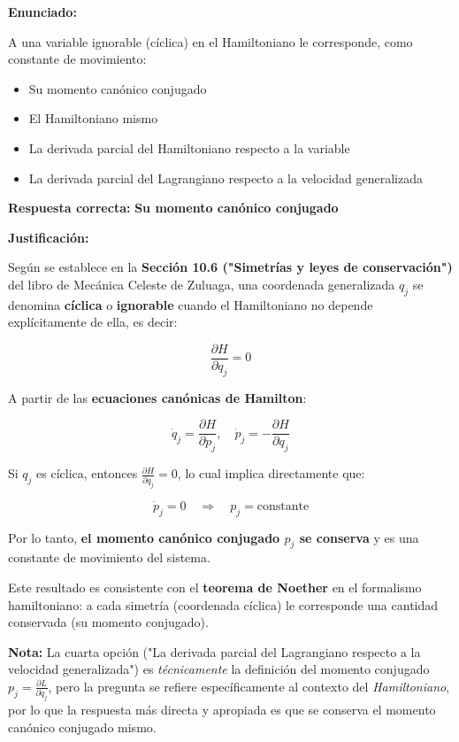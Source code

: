 \documentclass[a4paper]{article}
\begin{document}
\textbf{Enunciado:}

A una variable ignorable (cíclica) en el Hamiltoniano le corresponde, como constante de movimiento:

\begin{itemize}
    \item[$\circ$] Su momento canónico conjugado
    \item[$\circ$] El Hamiltoniano mismo
    \item[$\circ$] La derivada parcial del Hamiltoniano respecto a la variable
    \item[$\circ$] La derivada parcial del Lagrangiano respecto a la velocidad generalizada
\end{itemize}

\textbf{Respuesta correcta:} \textbf{Su momento canónico conjugado}

\textbf{Justificación:}

Según se establece en la \textbf{Sección 10.6 ("Simetrías y leyes de conservación")} del libro de Mecánica Celeste de Zuluaga, una coordenada generalizada $q_j$ se denomina \textbf{cíclica} o \textbf{ignorable} cuando el Hamiltoniano no depende explícitamente de ella, es decir:

$$\frac{\partial H}{\partial q_j} = 0$$

A partir de las \textbf{ecuaciones canónicas de Hamilton}:

$$\dot{q}_j = \frac{\partial H}{\partial p_j}, \quad \dot{p}_j = -\frac{\partial H}{\partial q_j}$$

Si $q_j$ es cíclica, entonces $\frac{\partial H}{\partial q_j} = 0$, lo cual implica directamente que:

$$\dot{p}_j = 0 \quad \Rightarrow \quad p_j = \text{constante}$$

Por lo tanto, \textbf{el momento canónico conjugado $p_j$ se conserva} y es una constante de movimiento del sistema.

Este resultado es consistente con el \textbf{teorema de Noether} en el formalismo hamiltoniano: a cada simetría (coordenada cíclica) le corresponde una cantidad conservada (su momento conjugado).

\textbf{Nota:} La cuarta opción ("La derivada parcial del Lagrangiano respecto a la velocidad generalizada") es \textit{técnicamente} la definición del momento conjugado $p_j = \frac{\partial L}{\partial \dot{q}_j}$, pero la pregunta se refiere específicamente al contexto del \textit{Hamiltoniano}, por lo que la respuesta más directa y apropiada es que se conserva el momento canónico conjugado mismo.
\end{document}
